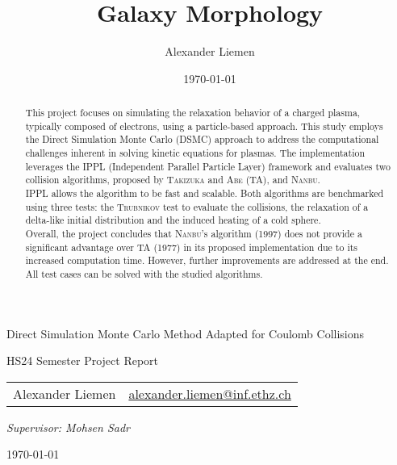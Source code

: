 \documentclass[12pt,a4paper]{article}
\title{\vspace{-2cm}Galaxy Morphology} %
\author{Alexander Liemen}
\date{\today}
\begin{document}
\begin{titlepage}
    \begin{center}
        {\Huge Direct Simulation Monte Carlo Method Adapted for Coulomb Collisions}
        
        {\large HS24 Semester Project Report}
        \vspace{1cm}
        
        \begin{minipage}[h]{\linewidth}
            \centering
            \begin{tabular}{r|l}
                Alexander Liemen & \href{mailto:alexander.liemen@inf.ethz.ch}{alexander.liemen@inf.ethz.ch} 
            \end{tabular}
        \end{minipage}
        \vspace{0.5cm}
        
        {\large\textit{Supervisor: Mohsen Sadr}}
        \vspace{0.5cm}
        
        {\large\today}
    \end{center}
    
    \vfil
    \begin{abstract}\label{abstract}
This project focuses on simulating the relaxation behavior of a charged plasma, typically composed of electrons, using a particle-based approach. 
This study employs the Direct Simulation Monte Carlo (DSMC) approach to address the computational challenges inherent in solving kinetic equations for plasmas. The implementation leverages the IPPL (Independent Parallel Particle Layer) framework and evaluates two collision algorithms, proposed by \textsc{Takizuka} and \textsc{Abe} (TA), and \textsc{Nanbu}. \\
IPPL allows the algorithm to be fast and scalable. Both algorithms are benchmarked using three tests: the \textsc{Trubnikov} test to evaluate the collisions, the relaxation of a delta-like initial distribution and the induced heating of a cold sphere. \\
Overall, the project concludes that \textsc{Nanbu}'s algorithm (1997) does not provide a significant advantage over TA (1977) in its proposed implementation due to its increased computation time. However, further improvements are addressed at the end. All test cases can be solved with the studied algorithms.
    \end{abstract}
\end{titlepage}
\end{document}
